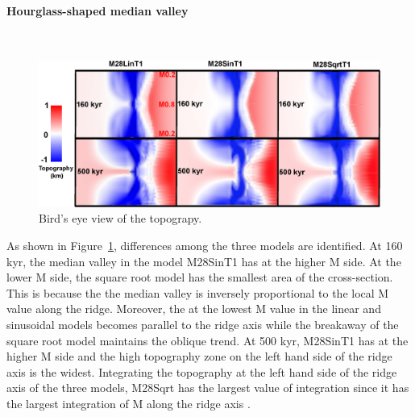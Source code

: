\paragraph{Hourglass-shaped median valley}
~\\
\begin{figure}[h]
  \centering
    \includegraphics[width=1.0\textwidth]{./Figures/fig_Results_3_3_1_hourglass.eps}
  \caption{Bird's eye view of the topograpy.  }
 \label{fig_Results_3_3_1_hourglass}
\end{figure} 

As shown in Figure~\hyperref[fig_Results_3_3_1_hourglass]{\ref{fig_Results_3_3_1_hourglass}}, differences among the three models are identified. At 160 kyr, the median valley in the model M28SinT1 has  at the higher M side.  At the lower M side, the square root model has the smallest area of the cross-section. This is because the  the median valley is inversely proportional to the local M value along the ridge. Moreover, the  at the lowest M value in the linear and sinusoidal models becomes parallel to the ridge axis while the breakaway of the square root model maintains the oblique trend.  At 500 kyr, M28SinT1 has  at the higher M side and the high topography zone on the left hand side of the ridge axis is the widest. Integrating the topography at the left hand side of the ridge axis of the three models, M28Sqrt has the largest value of integration since it has the largest integration of M along the ridge axis .

